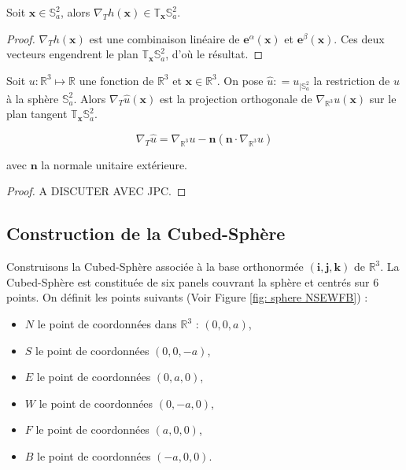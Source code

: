 \begin{proposition}
Soit $\mathbf{x} \in \mathbb{S}_a^2$, alors $\nabla_{T} h (\mathbf{x}) \in \mathbb{T}_{\mathbf{x}} \mathbb{S}_a^2$.
\end{proposition}

\begin{proof}
$\nabla_{T} h (\mathbf{x})$ est une combinaison linéaire de $\mathbf{e}^{\alpha}(\mathbf{x})$ et $\mathbf{e}^{\beta}(\mathbf{x})$. Ces deux vecteurs engendrent le plan $\mathbb{T}_{\mathbf{x}}\mathbb{S}_a^2$, d'où le résultat.
\end{proof}

\begin{proposition}
Soit $u: \mathbb{R}^3 \mapsto \mathbb{R}$ une fonction de $\mathbb{R}^3$ et $\mathbf{x} \in \mathbb{R}^3$. On pose $\hat{u} : = u_{|\mathbb{S}_a^2}$ la restriction de $u$ à la sphère $\mathbb{S}_a^2$. Alors $\nabla_{T} \hat{u} (\mathbf{x})$ est la projection orthogonale de $\nabla_{\mathbb{R}^3} u (\mathbf{x})$ sur le plan tangent $\mathbb{T}_{\mathbf{x}} \mathbb{S}_a^2$.

\begin{equation}
\nabla_T \hat{u} = \nabla_{\mathbb{R}^3} u - \mathbf{n} \left( \mathbf{n} \cdot \nabla_{\mathbb{R}^3} u \right)
\end{equation}

avec $\mathbf{n}$ la normale unitaire extérieure.
\end{proposition}

\begin{proof}
A DISCUTER AVEC JPC.
\end{proof}





\subsection{Construction de la Cubed-Sphère}

Construisons la Cubed-Sphère associée à la base orthonormée $(\mathbf{i}, \mathbf{j}, \mathbf{k})$ de $\mathbb{R}^3$. La Cubed-Sphère est constituée de six panels couvrant la sphère et centrés sur 6 points. 
On définit les points suivants (Voir Figure \ref{fig: sphere NSEWFB}) :
\begin{itemize}
\item $N$ le point de coordonnées dans $\mathbb{R}^3$ : $(0,0,a)$,
\item $S$ le point de coordonnées $(0,0,-a)$,
\item $E$ le point de coordonnées $(0,a,0)$,
\item $W$ le point de coordonnées $(0,-a,0)$,
\item $F$ le point de coordonnées $(a,0,0)$,
\item $B$ le point de coordonnées $(-a,0,0)$.
\end{itemize}


